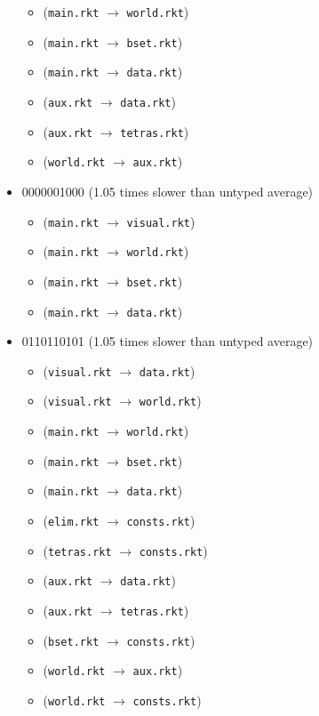 \documentclass{article}
\newcommand{\mono}[1]{\texttt{#1}}
\begin{document}
\begin{itemize}
\begin{itemize}
  \item (\mono{main.rkt} $\rightarrow$ \mono{world.rkt})
  \item (\mono{main.rkt} $\rightarrow$ \mono{bset.rkt})
  \item (\mono{main.rkt} $\rightarrow$ \mono{data.rkt})
  \item (\mono{aux.rkt} $\rightarrow$ \mono{data.rkt})
  \item (\mono{aux.rkt} $\rightarrow$ \mono{tetras.rkt})
  \item (\mono{world.rkt} $\rightarrow$ \mono{aux.rkt})
  \end{itemize}
\item 0000001000 (1.05 times slower than untyped average)
  \begin{itemize}
  \item (\mono{main.rkt} $\rightarrow$ \mono{visual.rkt})
  \item (\mono{main.rkt} $\rightarrow$ \mono{world.rkt})
  \item (\mono{main.rkt} $\rightarrow$ \mono{bset.rkt})
  \item (\mono{main.rkt} $\rightarrow$ \mono{data.rkt})
  \end{itemize}
\item 0110110101 (1.05 times slower than untyped average)
  \begin{itemize}
  \item (\mono{visual.rkt} $\rightarrow$ \mono{data.rkt})
  \item (\mono{visual.rkt} $\rightarrow$ \mono{world.rkt})
  \item (\mono{main.rkt} $\rightarrow$ \mono{world.rkt})
  \item (\mono{main.rkt} $\rightarrow$ \mono{bset.rkt})
  \item (\mono{main.rkt} $\rightarrow$ \mono{data.rkt})
  \item (\mono{elim.rkt} $\rightarrow$ \mono{consts.rkt})
  \item (\mono{tetras.rkt} $\rightarrow$ \mono{consts.rkt})
  \item (\mono{aux.rkt} $\rightarrow$ \mono{data.rkt})
  \item (\mono{aux.rkt} $\rightarrow$ \mono{tetras.rkt})
  \item (\mono{bset.rkt} $\rightarrow$ \mono{consts.rkt})
  \item (\mono{world.rkt} $\rightarrow$ \mono{aux.rkt})
  \item (\mono{world.rkt} $\rightarrow$ \mono{consts.rkt})
  \end{itemize}

\end{itemize}
\end{document}
